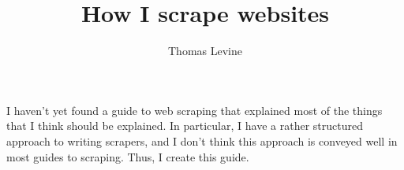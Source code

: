 \documentclass{article}
\title{How I scrape websites}
\author{Thomas Levine}
\begin{document}
\maketitle

I haven't yet found a guide to web scraping that explained most of
the things that I think should be explained. In particular, I have
a rather structured approach to writing scrapers, and I don't think
this approach is conveyed well in most guides to scraping. Thus, I
create this guide.
\end{document}
